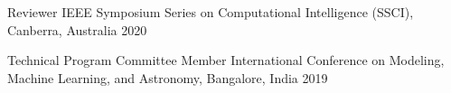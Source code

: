 


\begin{cvhonors}

    \cvhonor
        {Reviewer}
        {IEEE Symposium Series on Computational Intelligence (SSCI), Canberra, Australia}
        {}
        {2020}

    \cvhonor
        {Technical Program Committee Member}
        {International Conference on Modeling, Machine Learning, and Astronomy, Bangalore, India}
        {}
        {2019}

\end{cvhonors}
